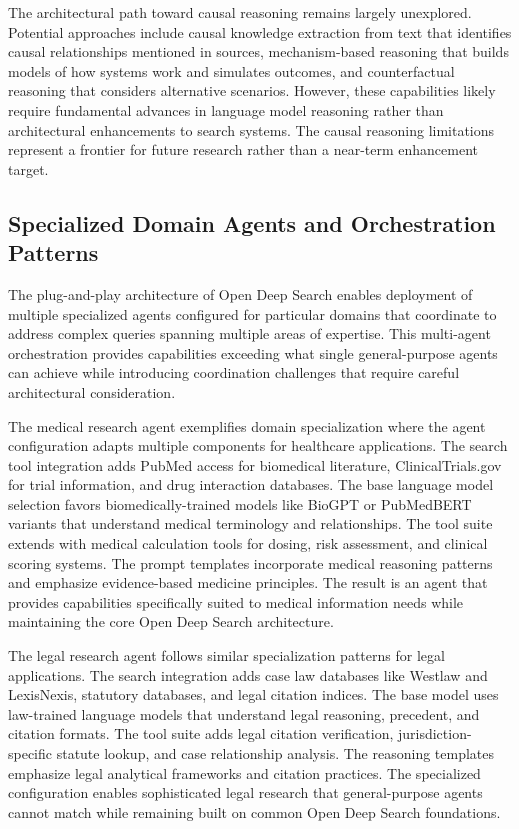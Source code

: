 The architectural path toward causal reasoning remains largely unexplored. Potential approaches include causal knowledge extraction from text that identifies causal relationships mentioned in sources, mechanism-based reasoning that builds models of how systems work and simulates outcomes, and counterfactual reasoning that considers alternative scenarios. However, these capabilities likely require fundamental advances in language model reasoning rather than architectural enhancements to search systems. The causal reasoning limitations represent a frontier for future research rather than a near-term enhancement target.

\subsection{Specialized Domain Agents and Orchestration Patterns}

The plug-and-play architecture of Open Deep Search enables deployment of multiple specialized agents configured for particular domains that coordinate to address complex queries spanning multiple areas of expertise. This multi-agent orchestration provides capabilities exceeding what single general-purpose agents can achieve while introducing coordination challenges that require careful architectural consideration.

The medical research agent exemplifies domain specialization where the agent configuration adapts multiple components for healthcare applications. The search tool integration adds PubMed access for biomedical literature, ClinicalTrials.gov for trial information, and drug interaction databases. The base language model selection favors biomedically-trained models like BioGPT or PubMedBERT variants that understand medical terminology and relationships. The tool suite extends with medical calculation tools for dosing, risk assessment, and clinical scoring systems. The prompt templates incorporate medical reasoning patterns and emphasize evidence-based medicine principles. The result is an agent that provides capabilities specifically suited to medical information needs while maintaining the core Open Deep Search architecture.

The legal research agent follows similar specialization patterns for legal applications. The search integration adds case law databases like Westlaw and LexisNexis, statutory databases, and legal citation indices. The base model uses law-trained language models that understand legal reasoning, precedent, and citation formats. The tool suite adds legal citation verification, jurisdiction-specific statute lookup, and case relationship analysis. The reasoning templates emphasize legal analytical frameworks and citation practices. The specialized configuration enables sophisticated legal research that general-purpose agents cannot match while remaining built on common Open Deep Search foundations.

